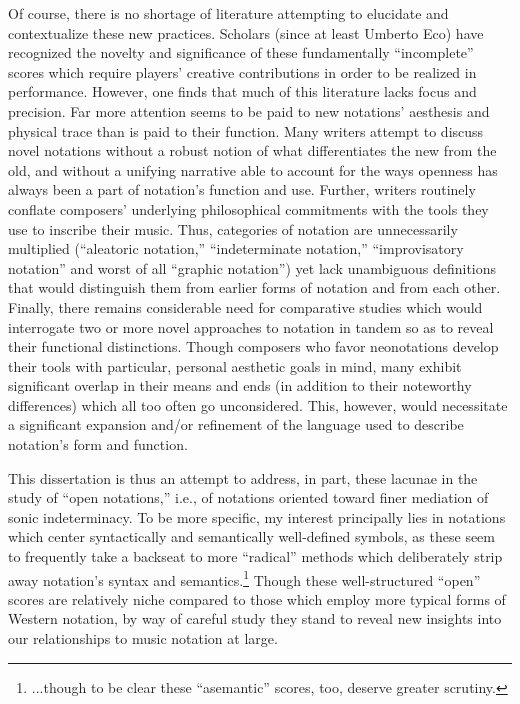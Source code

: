 Of course, there is no shortage of literature attempting to elucidate and contextualize these new practices. 
Scholars (since at least Umberto Eco) have recognized the novelty and significance of these fundamentally ``incomplete'' scores which require players' creative contributions in order to be realized in performance. 
However, one finds that much of this literature lacks focus and precision. 
Far more attention seems to be paid to new notations' aesthesis and physical trace than is paid to their function.
Many writers attempt to discuss novel notations without a robust notion of what differentiates the new from the old, and without a unifying narrative able to account for the ways openness has always been a part of notation's function and use.
Further, writers routinely conflate composers' underlying philosophical commitments with the tools they use to inscribe their music.
Thus, categories of notation are unnecessarily multiplied (``aleatoric notation,'' ``indeterminate notation,'' ``improvisatory notation'' and worst of all ``graphic notation'') yet lack unambiguous definitions that would distinguish them from earlier forms of notation and from each other.
Finally, there remains considerable need for comparative studies which would interrogate two or more novel approaches to notation in tandem so as to reveal their functional distinctions.
Though composers who favor neonotations develop their tools with particular, personal aesthetic goals in mind, many exhibit significant overlap in their means and ends (in addition to their noteworthy differences) which all too often go unconsidered.
This, however, would necessitate a significant expansion and/or refinement of the language used to describe notation's form and function.

    
This dissertation is thus an attempt to address, in part, these lacunae in the study of ``open notations,'' i.e., of notations oriented toward finer mediation of sonic indeterminacy.
To be more specific, my interest principally lies in notations which center syntactically and semantically well-defined symbols, as these seem to frequently take a backseat to more ``radical'' methods which deliberately strip away notation's syntax and semantics.\footnote{...though to be clear these ``asemantic'' scores, too, deserve greater scrutiny.}
Though these well-structured ``open'' scores are relatively niche compared to those which employ more typical forms of Western notation, by way of careful study they stand to reveal new insights into our relationships to music notation at large.

